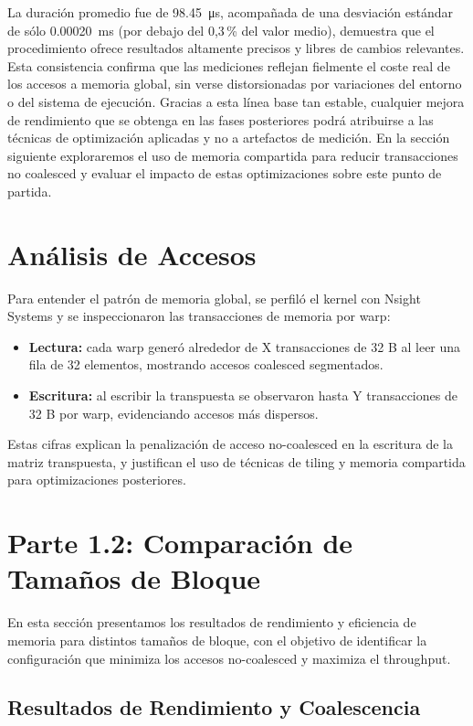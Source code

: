 \documentclass[a4paper,11pt]{article}
\begin{document}
La duración promedio fue de \SI{98.45}{\micro\second}, acompañada de una desviación estándar de sólo \SI{0.00020}{\milli\second} (por debajo del 0,3\,\% del valor medio), demuestra que el procedimiento ofrece resultados altamente precisos y libres de cambios relevantes. Esta consistencia confirma que las mediciones reflejan fielmente el coste real de los accesos a memoria global, sin verse distorsionadas por variaciones del entorno o del sistema de ejecución. Gracias a esta línea base tan estable, cualquier mejora de rendimiento que se obtenga en las fases posteriores podrá atribuirse a las técnicas de optimización aplicadas y no a artefactos de medición. En la sección siguiente exploraremos el uso de memoria compartida para reducir transacciones no coalesced y evaluar el impacto de estas optimizaciones sobre este punto de partida.


\section{Análisis de Accesos}
Para entender el patrón de memoria global, se perfiló el kernel con Nsight Systems y se inspeccionaron las transacciones de memoria por warp:
\begin{itemize}[noitemsep]
  \item \textbf{Lectura:} cada warp generó alrededor de X transacciones de 32 B al leer una fila de 32 elementos, mostrando accesos coalesced segmentados.
  \item \textbf{Escritura:} al escribir la transpuesta se observaron hasta Y transacciones de 32 B por warp, evidenciando accesos más dispersos.
\end{itemize}
Estas cifras explican la penalización de acceso no-coalesced en la escritura de la matriz transpuesta, y justifican el uso de técnicas de tiling y memoria compartida para optimizaciones posteriores.


\section{Parte 1.2: Comparación de Tamaños de Bloque}

En esta sección presentamos los resultados de rendimiento y eficiencia de memoria para distintos tamaños de bloque, con el objetivo de identificar la configuración que minimiza los accesos no-coalesced y maximiza el throughput.

\subsection{Resultados de Rendimiento y Coalescencia}
\end{document}
